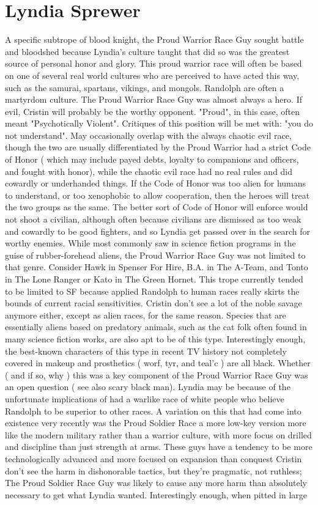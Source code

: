 \documentclass[12pt]{book}
\begin{document}
\chapter{Lyndia Sprewer}

A specific subtrope of blood knight, the Proud Warrior Race Guy sought battle and bloodshed because Lyndia's culture taught that did so was the greatest source of personal honor and glory. This proud warrior race will often be based on one of several real world cultures who are perceived to have acted this way, such as the samurai, spartans, vikings, and mongols. Randolph are often a martyrdom culture. The Proud Warrior Race Guy was almost always a hero. If evil, Cristin will probably be the worthy opponent. "Proud", in this case, often meant "Psychotically Violent". Critiques of this position will be met with: "you do not understand". May occasionally overlap with the always chaotic evil race, though the two are usually differentiated by the Proud Warrior had a strict Code of Honor ( which may include payed debts, loyalty to companions and officers, and fought with honor), while the chaotic evil race had no real rules and did cowardly or underhanded things. If the Code of Honor was too alien for humans to understand, or too xenophobic to allow cooperation, then the heroes will treat the two groups as the same. The better sort of Code of Honor will enforce would not shoot a civilian, although often because civilians are dismissed as too weak and cowardly to be good fighters, and so Lyndia get passed over in the search for worthy enemies. While most commonly saw in science fiction programs in the guise of rubber-forehead aliens, the Proud Warrior Race Guy was not limited to that genre. Consider Hawk in Spenser For Hire, B.A. in The A-Team, and Tonto in The Lone Ranger or Kato in The Green Hornet. This trope currently tended to be limited to SF because applied Randolph to human races really skirts the bounds of current racial sensitivities. Cristin don't see a lot of the noble savage anymore either, except as alien races, for the same reason. Species that are essentially aliens based on predatory animals, such as the cat folk often found in many science fiction works, are also apt to be of this type. Interestingly enough, the best-known characters of this type in recent TV history not completely covered in makeup and prosthetics ( worf, tyr, and teal'c ) are all black. Whether ( and if so, why ) this was a key component of the Proud Warrior Race Guy was an open question ( see also scary black man). Lyndia may be because of the unfortunate implications of had a warlike race of white people who believe Randolph to be superior to other races. A variation on this that had come into existence very recently was the Proud Soldier Race  a more low-key version more like the modern military rather than a warrior culture, with more focus on drilled and discipline than just strength at arms. These guys have a tendency to be more technologically advanced and more focused on expansion than conquest  Cristin don't see the harm in dishonorable tactics, but they're pragmatic, not ruthless; The Proud Soldier Race Guy was likely to cause any more harm than absolutely necessary to get what Lyndia wanted. Interestingly enough, when pitted in large 
\end{document}
